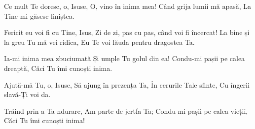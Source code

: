 \beginverse
Ce mult Te doresc, o, Isuse,
O, vino în inima mea!
Când grija lumii mă apasă,
La Tine-mi găsesc liniștea.
\endverse

\beginchorus
Fericit eu voi fi cu Tine, Isus,
Zi de zi, pas cu pas, când voi fi încercat!
La bine și la greu Tu mă vei ridica,
Eu Te voi lăuda pentru dragostea Ta.
\endchorus

\beginverse
Ia-mi inima mea zbuciumată
Și umple Tu golul din ea!
Condu-mi pașii pe calea dreaptă,
Căci Tu îmi cunoști inima.
\endverse

\beginverse
Ajută-mă Tu, o, Isuse,
Să ajung în prezența Ta,
În cerurile Tale sfinte,
Cu îngerii slavă-Ți voi da.
\endverse

\beginverse
Trăind prin a Ta-ndurare,
Am parte de jertfa Ta;
Condu-mi pașii pe calea vieții,
Căci Tu îmi cunoști inima!
\endverse
\endsong